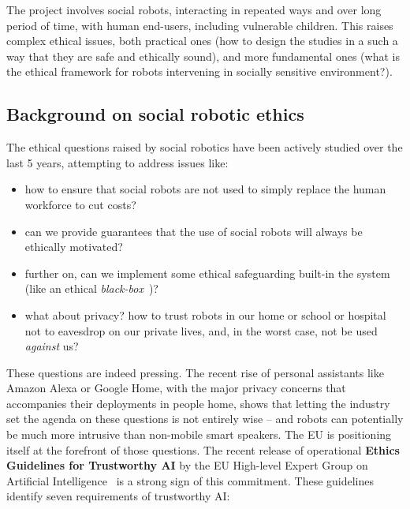 %




The \project project involves social robots, interacting in repeated ways and
over long period of time, with human end-users, including vulnerable children.
This raises complex ethical issues, both practical ones (how to design the
\project studies in a such a way that they are safe and ethically sound), and
more fundamental ones (what is the ethical framework for robots intervening in
socially sensitive environment?).



\subsection{Background on social robotic ethics}\label{ethics}

The ethical questions raised by social robotics have been actively studied over
the last 5 years, attempting to address issues like:

\begin{itemize}
    \item how to ensure that social robots are not used to simply replace the human
        workforce to cut costs?
    \item can we provide guarantees that the use of social robots will always be
        ethically motivated?
    \item further on, can we implement some ethical safeguarding built-in
        the system (like an ethical \emph{black-box}~\cite{winfield2017case})?
    \item what about privacy? how to trust robots in our home or school or
        hospital not to eavesdrop on our private lives, and, in the worst
        case, not be used \emph{against} us?
\end{itemize}

These questions are indeed pressing. The recent rise of personal assistants like
Amazon Alexa or Google Home, with the major privacy concerns that accompanies
their deployments in people home, shows that letting the industry set the agenda
on these questions is not entirely wise -- and robots can potentially be much
more intrusive than non-mobile smart speakers.  The EU is positioning itself at
the forefront of those questions. The recent release of operational \textbf{Ethics
Guidelines for Trustworthy AI} by the EU High-level Expert Group on Artificial
Intelligence~\cite{eu2019ethics} is a strong sign of this commitment. These
guidelines identify seven requirements of trustworthy AI:

